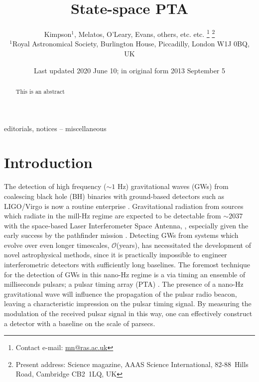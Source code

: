 \documentclass[fleqn,usenatbib,useAMS]{mnras}
\title[Kalman PTA]{State-space PTA}
\author[Kimpson]{Kimpson$^{1}$, Melatos, O'Leary, Evans, others, etc. etc. %
\thanks{Contact e-mail: \href{mailto:mn@ras.ac.uk}{mn@ras.ac.uk}}%
\thanks{Present address: Science magazine, AAAS Science International, \mbox{82-88}~Hills Road, Cambridge CB2~1LQ, UK}%
\\
$^{1}$Royal Astronomical Society, Burlington House, Piccadilly, London W1J 0BQ, UK}
\date{Last updated 2020 June 10; in original form 2013 September 5}
\begin{document}
\label{firstpage}
\pagerange{\pageref{firstpage}--\pageref{lastpage}}
\maketitle

\begin{abstract}
This is an abstract
\end{abstract}

\begin{keywords}
editorials, notices -- miscellaneous
\end{keywords}



\begingroup
\let\clearpage\relax
\endgroup
\newpage

\section{Introduction}



The detection of high frequency ($\sim1$ Hz) gravitational waves (GWs) from coalescing black hole (BH) binaries with ground-based detectors such as LIGO/Virgo \citep{aLIGO,2015CQGra..32b4001A} is now a routine enterprise \citep[e.g.][]{2019PhRvX...9c1040A,2021PhRvX..11b1053A}. Gravitational radiation from sources which radiate in the mill-Hz regime are expected to be detectable from $\sim 2037$ with the space-based Laser Interferometer Space Antenna, \citep{LISApaper}, especially given the early success by the pathfinder mission \citep{2019arXiv190308924A}. Detecting GWs from systems which evolve over even longer timescales, $\mathcal{O}$(years), has necessitated the development of novel astrophysical methods, since it is practically impossible to engineer interferometric detectors with sufficiently long baselines. The foremost technique for the detection of GWs in this nano-Hz regime is a via timing an ensemble of milliseconds pulsars; a pulsar timing array (PTA) \citep{2021hgwa.bookE...4V}. The presence  of a nano-Hz gravitational wave will influence the propagation of the pulsar radio beacon, leaving a characteristic impression on the pulsar timing signal. By measuring the modulation of the received pulsar signal in this way, one can effectively construct a detector with a baseline on the scale of parsecs. \newline 
\end{document}
